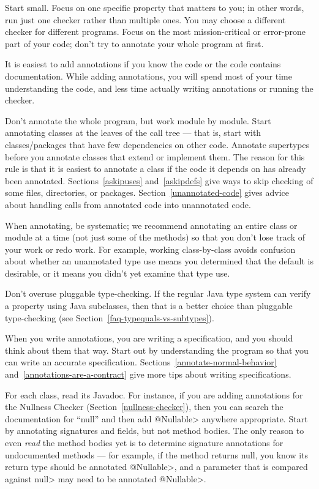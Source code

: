 
Start small.  Focus on one specific property that matters to you; in
other words, run just one checker rather than multiple ones.  You may
choose a different checker for different programs.
Focus on
the most mission-critical or error-prone part of your code; don't try to
annotate your whole program at first.

It is easiest to add annotations if you know the code or the
code contains documentation.  While adding annotations, you will spend most of your time
understanding the code, and less time actually writing annotations
or running the checker.

Don't annotate the whole program, but work module by module.
Start annotating classes at the leaves of the call tree ---
that is,
start with classes/packages that have few dependencies on other
code.
Annotate supertypes before you
annotate classes that extend or implement them.
The reason for this rule is that it is
easiest to annotate a class if the code it depends on has already been
annotated.
Sections~\ref{askipuses} and~\ref{askipdefs} give ways to skip
checking of some files, directories, or packages.
Section~\ref{unannotated-code} gives advice about handling calls from
annotated code into unannotated code.

When annotating, be systematic; we recommend
annotating an entire class or module at a time (not just some of the methods)
so that you don't lose track of your work or redo work.  For example,
working class-by-class avoids confusion about whether an unannotated type use
means you determined that the default is desirable, or it means you didn't
yet examine that type use.

Don't overuse pluggable type-checking.  If the regular Java type system can
verify a property using Java subclasses, then that is a better choice than
pluggable type-checking (see Section~\ref{faq-typequals-vs-subtypes}).



When you write annotations, you are writing a specification, and you should
think about them that way.  Start out by understanding the program so that
you can write an accurate specification.
Sections~\ref{annotate-normal-behavior}
and~\ref{annotations-are-a-contract} give more tips about writing
specifications.

For each class, read its Javadoc.  For instance, if you are adding
annotations for the Nullness Checker (Section~\ref{nullness-checker}), then
you can search the documentation for ``null'' and then add \<@Nullable>
anywhere appropriate.  Start by annotating signatures and fields, but not
method bodies.  The only reason to even
\emph{read} the method bodies yet is to determine signature annotations for
undocumented methods ---
for example, if the method returns null, you know its return type should be
annotated \<@Nullable>, and a parameter that is compared against \<null>
may need to be annotated \<@Nullable>.

